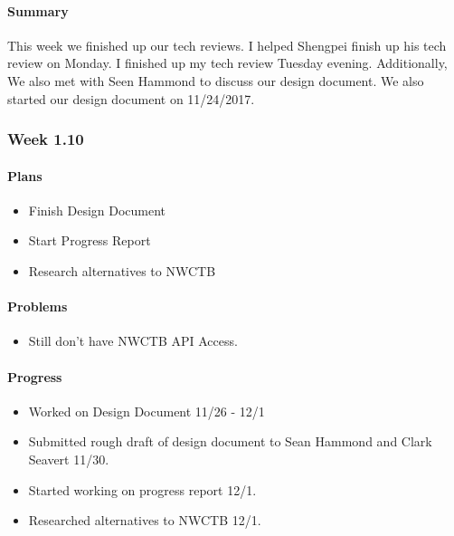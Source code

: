 \documentclass[onecolumn, draftclsnofoot,10pt, compsoc]{article}
\begin{document}
		    \paragraph{Summary} \hfill \break
		         This week we finished up our tech reviews. I helped Shengpei finish up his tech review on Monday. I finished up my tech review Tuesday evening. Additionally, We also met with Seen Hammond to discuss our design document. We also started our design document on 11/24/2017.\\

		\subsubsection{Week 1.10}

		    \paragraph{Plans} \hfill \break
		        \begin{itemize}
		            \item Finish Design Document
		            \item Start Progress Report
		            \item Research alternatives to NWCTB
		        \end{itemize}

		    \paragraph{Problems} \hfill \break
		        \begin{itemize}
		            \item Still don't have NWCTB API Access.
		        \end{itemize}

		    \paragraph{Progress} \hfill \break
		        \begin{itemize}
		            \item Worked on Design Document 11/26 - 12/1
		            \item Submitted rough draft of design document to Sean Hammond and Clark Seavert 11/30.
		            \item Started working on progress report 12/1.
		            \item Researched alternatives to NWCTB 12/1.
		        \end{itemize}
\end{document}
